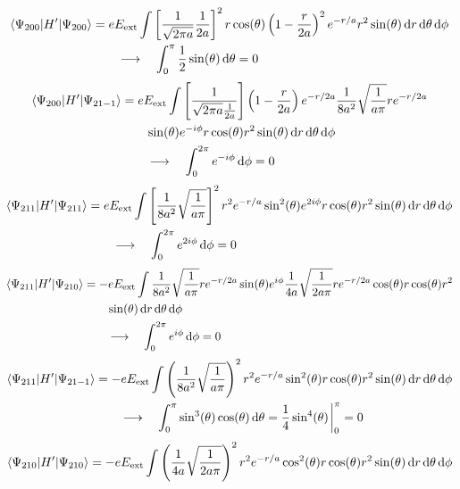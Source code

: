 \documentclass[11pt]{article}
\begin{document}
\begin{enumerate}[label=\alph*)]
\begin{align*}
\mel{\Psi_{200}}{H^\prime}{\Psi_{200}} & = eE_{\text{ext}}\int\left[\frac{1}{\sqrt{2\pi	a}}\frac{1}{2a}\right]^2 r\cos(\theta)\left(1-\frac{r}{2a}\right)^2e^{-r/a}r^2\sin(\theta)\dd{r}\dd{\theta}\dd{\phi}\\
& \qquad \longrightarrow \quad  \int_0^\pi \frac{1}{2}\sin(\theta)\dd{\theta} = 0
\end{align*}
\begin{align*}
\mel{\Psi_{200}}{H^\prime}{\Psi_{21-1}} & = eE_{\text{ext}}\int \left[\frac{1}{\sqrt{2\pi a}\frac{1}{2a}}\right]\left(1-\frac{r}{2a}\right)e^{-r/2a}\frac{1}{8a^2}\sqrt{\frac{1}{a\pi}}re^{-r/2a}\\
& \qquad \sin(\theta)e^{-i\phi}r\cos(\theta)r^2\sin(\theta)\dd{r}\dd{\theta}\dd{\phi}\\
& \qquad \longrightarrow \quad  \int_0^{2\pi} e^{-i\phi}\dd{\phi} = 0
\end{align*}
\begin{align*}
\mel{\Psi_{211}}{H^\prime}{\Psi_{211}} & = eE_{\text{ext}}\int \left[\frac{1}{8a^2}\sqrt{\frac{1}{a\pi}}\right]^2 r^2 e^{-r/a}\sin[2](\theta)e^{2i\phi}r\cos(\theta)r^2\sin(\theta)\dd{r}\dd{\theta}\dd{\phi}\\
& \qquad \longrightarrow \quad  \int_0^{2\pi} e^{2i\phi}\dd{\phi} = 0
\end{align*}
\begin{align*}
\mel{\Psi_{211}}{H^\prime}{\Psi_{210}} & = -eE_{\text{ext}}\int \frac{1}{8a^2}\sqrt{\frac{1}{a\pi}}re^{-r/2a}\sin(\theta)e^{i\phi}\frac{1}{4a}\sqrt{\frac{1}{2a\pi}}re^{-r/2a}\cos(\theta)r\cos(\theta)r^2\\
& \qquad \sin(\theta)\dd{r}\dd{\theta}\dd{\phi}\\
& \qquad \longrightarrow \quad  \int_0^{2\pi} e^{i\phi}\dd{\phi} = 0
\end{align*}
\begin{align*}
\mel{\Psi_{211}}{H^\prime}{\Psi_{21-1}} & = -eE_{\text{ext}}\int \left(\frac{1}{8a^2}\sqrt{\frac{1}{a\pi}}\right)^2 r^2 e^{-r/a}\sin[2](\theta)r\cos(\theta)r^2\sin(\theta)\dd{r}\dd{\theta}\dd{\phi}\\
& \qquad \longrightarrow \quad  \int_0^\pi \sin[3](\theta)\cos(\theta)\dd{\theta} = \frac{1}{4}\sin[4](\theta)\eval_0^\pi = 0
\end{align*}
\begin{align*}
\mel{\Psi_{210}}{H^\prime}{\Psi_{210}} & =-eE_{\text{ext}}\int \left(\frac{1}{4a}\sqrt{\frac{1}{2a\pi}}\right)^2r^2e^{-r/a}\cos[2](\theta)r\cos(\theta)r^2\sin(\theta)\dd{r}\dd{\theta}\dd{\phi}\\

\end{align*}
\end{enumerate}
\end{document}
